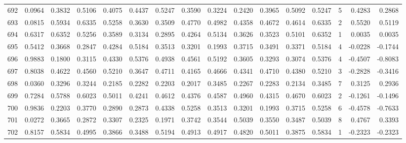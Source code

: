 \begin{tabular}{lrrrrrrrrrrrrrrr}
692 &      0.0964 &  0.3832 &  0.5106 &  0.4075 &  0.4437 &  0.5247 &  0.3590 &  0.3224 &  0.2420 &  0.3965 &   0.5092 &     0.5247 &      5 &                    0.4283 &                     0.2868 \\
693 &      0.0815 &  0.5934 &  0.6335 &  0.5258 &  0.3630 &  0.3509 &  0.4770 &  0.4982 &  0.4358 &  0.4672 &   0.4614 &     0.6335 &      2 &                    0.5520 &                     0.5119 \\
694 &      0.6317 &  0.6352 &  0.5256 &  0.3589 &  0.3134 &  0.2895 &  0.4264 &  0.5134 &  0.3626 &  0.3523 &   0.5101 &     0.6352 &      1 &                    0.0035 &                     0.0035 \\
695 &      0.5412 &  0.3668 &  0.2847 &  0.4284 &  0.5184 &  0.3513 &  0.3201 &  0.1993 &  0.3715 &  0.3491 &   0.3371 &     0.5184 &      4 &                   -0.0228 &                    -0.1744 \\
696 &      0.9883 &  0.1800 &  0.3115 &  0.4330 &  0.5376 &  0.4938 &  0.4561 &  0.5192 &  0.3605 &  0.3293 &   0.3074 &     0.5376 &      4 &                   -0.4507 &                    -0.8083 \\
697 &      0.8038 &  0.4622 &  0.4560 &  0.5210 &  0.3647 &  0.4711 &  0.4165 &  0.4666 &  0.4341 &  0.4710 &   0.4380 &     0.5210 &      3 &                   -0.2828 &                    -0.3416 \\
698 &      0.0360 &  0.3296 &  0.3244 &  0.2185 &  0.2282 &  0.2203 &  0.2017 &  0.3485 &  0.2267 &  0.2283 &   0.2134 &     0.3485 &      7 &                    0.3125 &                     0.2936 \\
699 &      0.7284 &  0.5788 &  0.6023 &  0.5011 &  0.4241 &  0.4612 &  0.4376 &  0.4587 &  0.4960 &  0.4315 &   0.4670 &     0.6023 &      2 &                   -0.1261 &                    -0.1496 \\
700 &      0.9836 &  0.2203 &  0.3770 &  0.2890 &  0.2873 &  0.4338 &  0.5258 &  0.3513 &  0.3201 &  0.1993 &   0.3715 &     0.5258 &      6 &                   -0.4578 &                    -0.7633 \\
701 &      0.0272 &  0.3665 &  0.2872 &  0.3307 &  0.2325 &  0.1971 &  0.3742 &  0.3544 &  0.5039 &  0.3550 &   0.3487 &     0.5039 &      8 &                    0.4767 &                     0.3393 \\
702 &      0.8157 &  0.5834 &  0.4995 &  0.3866 &  0.3488 &  0.5194 &  0.4913 &  0.4917 &  0.4820 &  0.5011 &   0.3875 &     0.5834 &      1 &                   -0.2323 &                    -0.2323 \\

\end{tabular}
